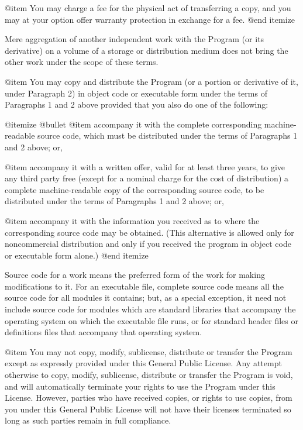 @item
You may charge a fee for the physical act of transferring a
copy, and you may at your option offer warranty protection in
exchange for a fee.
@end itemize

Mere aggregation of another independent work with the Program (or its
derivative) on a volume of a storage or distribution medium does not bring
the other work under the scope of these terms.

@item
You may copy and distribute the Program (or a portion or derivative of
it, under Paragraph 2) in object code or executable form under the terms of
Paragraphs 1 and 2 above provided that you also do one of the following:

@itemize @bullet
@item
accompany it with the complete corresponding machine-readable
source code, which must be distributed under the terms of
Paragraphs 1 and 2 above; or,

@item
accompany it with a written offer, valid for at least three
years, to give any third party free (except for a nominal charge
for the cost of distribution) a complete machine-readable copy of the
corresponding source code, to be distributed under the terms of
Paragraphs 1 and 2 above; or,

@item
accompany it with the information you received as to where the
corresponding source code may be obtained.  (This alternative is
allowed only for noncommercial distribution and only if you
received the program in object code or executable form alone.)
@end itemize

Source code for a work means the preferred form of the work for making
modifications to it.  For an executable file, complete source code means
all the source code for all modules it contains; but, as a special
exception, it need not include source code for modules which are standard
libraries that accompany the operating system on which the executable
file runs, or for standard header files or definitions files that
accompany that operating system.

@item
You may not copy, modify, sublicense, distribute or transfer the
Program except as expressly provided under this General Public License.
Any attempt otherwise to copy, modify, sublicense, distribute or transfer
the Program is void, and will automatically terminate your rights to use
the Program under this License.  However, parties who have received
copies, or rights to use copies, from you under this General Public
License will not have their licenses terminated so long as such parties
remain in full compliance.

